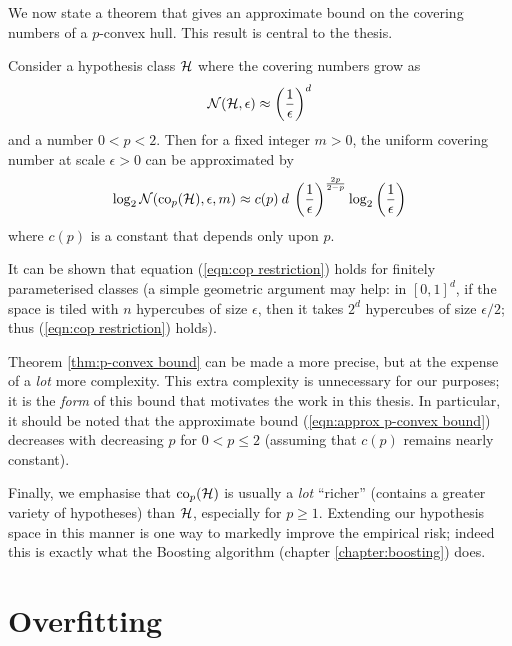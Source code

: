 We now state a theorem that gives an approximate bound on the covering
numbers of a $p$-convex hull.  This result is central to the thesis.

\begin{theorem}
\label{thm:p-convex bound}
Consider a hypothesis class $\mathcal{H}$ where the covering numbers grow as
%
\begin{equation}
\mathcal{N}({\mathcal{H}}, {\epsilon}) \approx \left( \frac{1}{\epsilon} \right) ^d
\label{eqn:cop restriction}
\end{equation}
%
and a number $0 < p < 2$.  Then for a fixed integer $m>0$, the
uniform covering number at scale $\epsilon > 0$ can be approximated by
%
\begin{equation}
\label{eqn:approx p-convex bound}
\log_2 \mathcal{N}({\mathrm{co}_p(\mathcal{H})}, {\epsilon}, {m}) \approx c(p) \: d \: \left(\frac{1}
{\epsilon}\right)^{\frac{2p}{2-p}} \log_2 \left(\frac{1}{\epsilon}\right)
\end{equation}
%
where $c(p)$ is a constant that depends only upon $p$.
\end{theorem}

It can be shown that equation (\ref{eqn:cop restriction}) holds for
finitely parameterised classes (a simple geometric argument may help:
in $[0,1]^d$, if the space is tiled with $n$ hypercubes of size
$\epsilon$, then it takes $2^d$ hypercubes of size $\epsilon/2$; thus
(\ref{eqn:cop restriction}) holds).
 
Theorem \ref{thm:p-convex bound} can be made a more precise, but at
the expense of a \emph{lot} more complexity.  This extra complexity is
unnecessary for our purposes; it is the \emph{form} of this bound that
motivates the work in this thesis. In particular, it should be noted
that the approximate bound (\ref{eqn:approx p-convex bound}) decreases
with decreasing $p$ for $0 < p \leq 2$ (assuming that $c(p)$ remains
nearly constant).

Finally, we emphasise that $\mathrm{co}_{p}(\mathcal{H})$ is usually a \emph{lot}
``richer'' (contains a greater variety of hypotheses) than $\mathcal{H}$,
especially for $p \geq 1$.  Extending our hypothesis space in this
manner is one way to markedly improve the empirical risk; indeed this
is exactly what the Boosting algorithm (chapter
\ref{chapter:boosting}) does.


\section{Overfitting}
\label{sec:overfitting}

